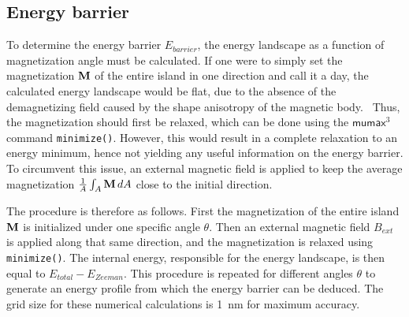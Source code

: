 \documentclass[10pt,a4paper]{article}
\newcommand{\code}[1]{\texttt{#1}}
\newcommand{\mumax}{$\mathsf{mumax}^3$}
\begin{document}
\subsection{Energy barrier}
To determine the energy barrier $E_{barrier}$, the energy landscape as a function of magnetization angle must be calculated. If one were to simply set the magnetization $\vb{M}$ of the entire island in one direction and call it a day, the calculated energy landscape would be flat, due to the absence of the demagnetizing field caused by the shape anisotropy of the magnetic body.~\cite{Nonmonotonic_reversal} Thus, the magnetization should first be relaxed, which can be done using the \mumax{} command \code{minimize()}. However, this would result in a complete relaxation to an energy minimum, hence not yielding any useful information on the energy barrier. To circumvent this issue, an external magnetic field is applied to keep the average magnetization $\frac{1}{A}\int_A \vb{M}\,dA$ close to the initial direction. \par
The procedure is therefore as follows. First the magnetization of the entire island $\vb{M}$ is initialized under one specific angle $\theta$. Then an external magnetic field $B_{ext}$ is applied along that same direction, and the magnetization is relaxed using \code{minimize()}. The internal energy, responsible for the energy landscape, is then equal to $E_{total} - E_{Zeeman}$. This procedure is repeated for different angles $\theta$ to generate an energy profile from which the energy barrier can be deduced. The grid size for these numerical calculations is \SI{1}{\nano\metre} for maximum accuracy.
\end{document}
